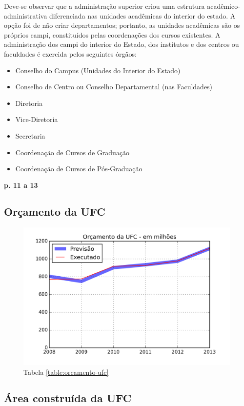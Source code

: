 \documentclass{report}
\begin{document}
Deve-se observar que a administração superior criou uma estrutura acadêmico-administrativa diferenciada nas unidades acadêmicas do interior do estado. A opção foi de não criar departamentos; portanto, as unidades acadêmicas são os próprios campi, constituídos pelas coordenações dos cursos existentes.
A administração dos campi do interior do Estado, dos institutos e dos centros ou faculdades é exercida pelos seguintes órgãos: 

\begin{itemize}
\item Conselho do Campus (Unidades do Interior do Estado)
\item Conselho de Centro ou Conselho Departamental (nas Faculdades)
\item Diretoria
\item Vice-Diretoria
\item Secretaria
\item Coordenação de Cursos de Graduação
\item Coordenação de Cursos de Pós-Graduação
\end{itemize}

\textbf{p. 11 a 13}

\subsection{Orçamento da UFC}

\begin{figure}[H]
	\includegraphics{img/orcamento_ufc.png}
	\caption{Tabela \ref{table:orcamento-ufc}}
	\label{img:orcamento-ufc}
\end{figure}

\subsection{Área construída da UFC}
\end{document}
